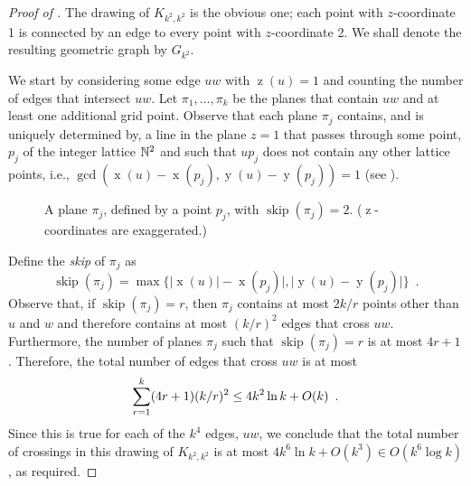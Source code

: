 \documentclass{patmorin}
\DeclareMathOperator{\x}{x}
\DeclareMathOperator{\y}{y}
\DeclareMathOperator{\z}{z}
\DeclareMathOperator{\skp}{skip}
\begin{document}
\begin{proof}[Proof of ]
The drawing of $K_{k^2,k^2}$ is the obvious one; each point with
$z$-coordinate 1 is connected by an edge to every point with
$z$-coordinate 2.  We shall denote the resulting geometric graph
by $G_{k^2}$.

We start by considering some edge $uw$ with $\z(u)=1$ and counting
the number of edges that intersect $uw$.  Let $\pi_1,\ldots,\pi_k$ be
the planes that contain $uw$ and at least one additional grid point.
Observe that each plane $\pi_j$ contains, and is uniquely determined by,
a line in the plane $z=1$ that passes through some point, $p_j$ of the
integer lattice $\mathbb{N}^2$ and such that $up_j$ does not contain any other
lattice points, i.e., $\gcd(\x(u)-\x(p_j),\y(u)-\y(p_j))=1$ (see ).
\begin{figure}
  \caption{A plane $\pi_j$, defined by a point $p_j$, with $\skp(\pi_j)=2$. ($\z$-coordinates are exaggerated.)}
\end{figure}
Define the \emph{skip} of $\pi_j$ as
\[
   \skp(\pi_j)=\max\{|\x(u)|-\x(p_j)|,|\y(u)-\y(p_j)|\} \enspace .
\]
Observe that, if $\skp(\pi_j)=r$, then $\pi_j$ contains at most $2k/r$
points other than $u$ and $w$ and therefore contains at most $(k/r)^2$
edges that cross $uw$.  Furthermore, the number of planes $\pi_j$ such
that $\skp(\pi_j)=r$ is at most $4r+1$.  Therefore, the total number
of edges that cross $uw$ is at most
\begin{equation}
   \sum_{r=1}^k (4r+1)(k/r)^2 \le 4k^2\ln k + O(k) \enspace . \eqlabel{critical}
\end{equation}
Since this is true for each of the $k^4$ edges, $uw$, we conclude that
the total number of crossings in this drawing of $K_{k^2,k^2}$ is at
most $4k^6\ln k+O(k^3)\in O(k^6\log k)$, as required.
\end{proof}
\end{document}
